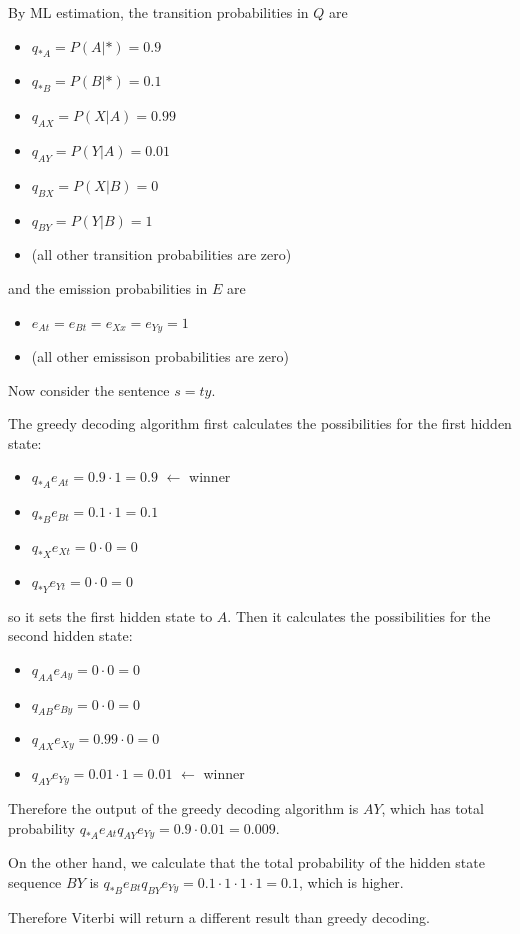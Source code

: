 \documentclass{article}
\begin{document}
\begin{itemize}
    By ML estimation, the transition probabilities in $Q$ are
    \begin{itemize}
        \item $q_{*A} = P(A | *) = 0.9$
        \item $q_{*B} = P(B | *) = 0.1$
        \item $q_{AX} = P(X | A) = 0.99$
        \item $q_{AY} = P(Y | A) = 0.01$
        \item $q_{BX} = P(X | B) = 0$
        \item $q_{BY} = P(Y | B) = 1$
        \item (all other transition probabilities are zero)
    \end{itemize}

    and the emission probabilities in $E$ are
    \begin{itemize}
        \item $e_{At} = e_{Bt} = e_{Xx} = e_{Yy} = 1$
        \item (all other emissison probabilities are zero)
    \end{itemize}

    Now consider the sentence $s = ty$.

    The greedy decoding algorithm first calculates the possibilities for the first hidden state:
    \begin{itemize}
        \item $q_{*A}e_{At} = 0.9 \cdot 1 = 0.9$ $\leftarrow$ winner
        \item $q_{*B}e_{Bt} = 0.1 \cdot 1 = 0.1$
        \item $q_{*X}e_{Xt} = 0 \cdot 0 = 0$
        \item $q_{*Y}e_{Yt} = 0 \cdot 0 = 0$
    \end{itemize}
    so it sets the first hidden state to $A$. Then it calculates the possibilities for the second hidden state:
    \begin{itemize}
        \item $q_{AA}e_{Ay} = 0 \cdot 0 = 0$
        \item $q_{AB}e_{By} = 0 \cdot 0 = 0$
        \item $q_{AX}e_{Xy} = 0.99 \cdot 0 = 0$
        \item $q_{AY}e_{Yy} = 0.01 \cdot 1 = 0.01$ $\leftarrow$ winner
    \end{itemize}
    Therefore the output of the greedy decoding algorithm is $AY$, which has total probability $q_{*A}e_{At}q_{AY}e_{Yy} = 0.9 \cdot 0.01 = 0.009$.

    On the other hand, we calculate that the total probability of the hidden state sequence $BY$ is $q_{*B}e_{Bt}q_{BY}e_{Yy} = 0.1 \cdot 1 \cdot 1 \cdot 1 = 0.1$, which is higher.

    Therefore Viterbi will return a different result than greedy decoding.

\end{itemize}
\end{document}
